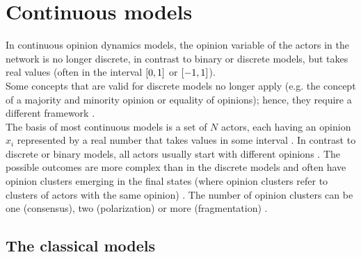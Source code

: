 \documentclass[11 pt , letterpaper , twoside , openright]{book}
\begin{document}
\section{Continuous models}\label{Con}

In continuous opinion dynamics models, the opinion variable of the actors in the network is no longer discrete, in contrast to binary or discrete models, but takes real values (often in the interval $\interval{0}{1}$ or $\interval{-1}{1}$).\\
\newline
Some concepts that are valid for discrete models no longer apply (e.g. the concept of a majority and minority opinion or equality of opinions); hence, they require a different framework \cite{Castellano2009}. \\
\newline
The basis of most continuous models is a set of $N$ actors, each having an opinion $x_i$ represented by a real number that takes values in some interval \cite{Castellano2009}. In contrast to discrete or binary models, all actors usually start with different opinions \cite{Castellano2009}. The possible outcomes are more complex than in the discrete models and often have opinion clusters emerging in the final states (where opinion clusters refer to clusters of actors with the same opinion) \cite{Castellano2009}. The number of opinion clusters can be one (consensus), two (polarization) or more (fragmentation) \cite{Castellano2009}.

\subsection{The classical models}\label{classMod}
\end{document}
